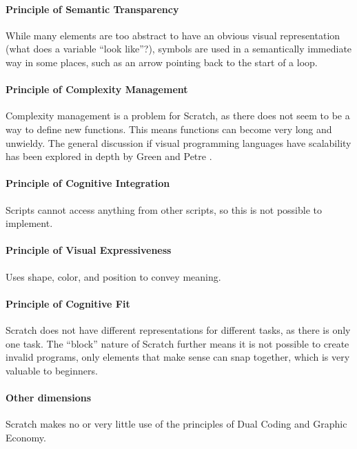 \paragraph{Principle of Semantic Transparency}
While many elements are too abstract to have an obvious visual representation (what does a variable ``look like''?), symbols are used in a semantically immediate way in some places, such as an arrow pointing back to the start of a loop. 

\paragraph{Principle of Complexity Management}
Complexity management is a problem for Scratch, as there does not seem to be a way to define new functions. This means functions can become very long and unwieldy. The general discussion if visual programming languages have scalability has been explored in depth by Green and Petre \cite{green1992visual}.

\paragraph{Principle of Cognitive Integration}
Scripts cannot access anything from other scripts, so this is not possible to implement. 

\paragraph{Principle of Visual Expressiveness}
Uses shape, color, and position to convey meaning. 

\paragraph{Principle of Cognitive Fit}
Scratch does not have different representations for different tasks, as there is only one task. The ``block'' nature of Scratch further means it is not possible to create invalid programs, only elements that make sense can snap together, which is very valuable to beginners.

\paragraph{Other dimensions}
Scratch makes no or very little use of the principles of Dual Coding and Graphic Economy.

